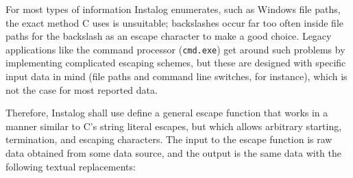 For most types of information Instalog enumerates, such as Windows file paths,
the exact method C uses is unsuitable; backslashes occur far too often inside
file paths for the backslash as an escape character to make a good choice.
Legacy applications like the command processor (\texttt{cmd.exe}) get around
such problems by implementing complicated escaping schemes, but these are
designed with specific input data in mind (file paths and command line
switches, for instance), which is not the case for most reported data.

\label{generalescape}
Therefore, Instalog shall use define a general escape function that works in a
manner similar to C's string literal escapes, but which allows arbitrary
starting, termination, and escaping characters. The input to the escape function
is raw data obtained from some data source, and the output is the same data with
the following textual replacements: 

